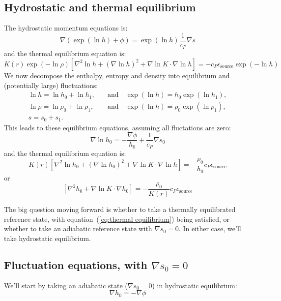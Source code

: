 \documentclass{aastex631}
\newcommand{\del}{\nabla}
\begin{document}
\subsection{Hydrostatic and thermal equilibrium}
The hydrostatic momentum equations is:
\begin{equation}
  \del (\exp(\ln h) + \phi) = \exp(\ln h)\frac{1}{c_P}\del s
\end{equation}
and the thermal equilibrium equation is:
\begin{equation}
  K(r) \exp(-\ln \rho)\left[\nabla^2 \ln h + \left(\nabla \ln h\right)^2 + \del \ln K \cdot \del \ln h \right] = - c_P \epsilon_\mathrm{source} \exp(-\ln h)
\end{equation}
We now decompose the enthalpy, entropy and density into equilibrium and (potentially large) fluctuations:
\begin{align}
  \ln h = \ln h_0 + \ln h_1, &\quad \text{and} \quad \exp(\ln h) = h_0 \exp(\ln h_1),\\
  \ln \rho = \ln \rho_0 + \ln \rho_1, &\quad \text{and} \quad \exp(\ln h) = \rho_0 \exp(\ln \rho_1),\\
  s = s_0 + s_1.
\end{align}
This leads to these equilibrium equations, assuming all fluctations are zero:
\begin{equation}
  \del \ln h_0 = -\frac{\del \phi}{h_0} + \frac{1}{c_P}\del s_0
\end{equation}
and the thermal equilibrium equation is:
\begin{equation}
  K(r) \left[\nabla^2 \ln h_0 + \left(\nabla \ln h_0\right)^2 + \del \ln K \cdot \del \ln h \right] = - \frac{\rho_0}{h_0} c_P \epsilon_\mathrm{source}
\end{equation}
or
\begin{equation}
  \left[\nabla^2 h_0 + \del \ln K \cdot \del h_0 \right] = - \frac{\rho_0}{K(r) } c_P \epsilon_\mathrm{source}
  \label{eq:thermal equilibrium}
\end{equation}

The big question moving forward is whether to take a thermally equilibrated reference state, with equation~(\ref{eq:thermal equilibrium}) being satisfied, or whether to take an adiabatic reference state with $\del s_0 = 0$.  In either case, we'll take hydrostatic equilibrium.

\subsection{Fluctuation equations, with $\del s_0 = 0$}
We'll start by taking an adiabatic state ($\del s_0 = 0$) in hydrostatic equilibrium:
\begin{equation}
  \del h_0 = - \del \phi
\end{equation}
\end{document}
